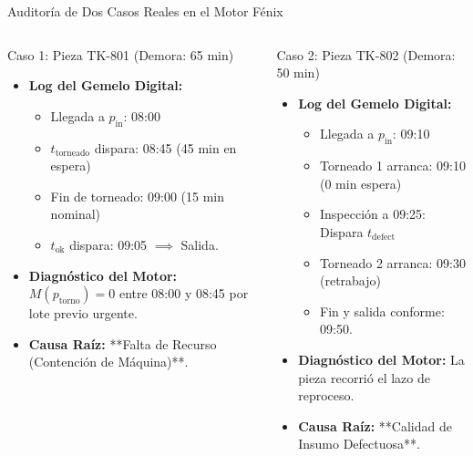 \documentclass[10pt, aspectratio=169]{beamer}
\begin{document}
\begin{frame}{Auditoría de Dos Casos Reales en el Motor Fénix}
	\begin{columns}
		\begin{alertblock}{Caso 1: Pieza TK-801 (Demora: 65 min)}
			\begin{itemize}
				\item \textbf{Log del Gemelo Digital:}
				\begin{itemize}
					\item Llegada a $p_{\text{in}}$: 08:00
					\item $t_{\text{torneado}}$ dispara: 08:45 (\alert{45 min en espera})
					\item Fin de torneado: 09:00 (15 min nominal)
					\item $t_{\text{ok}}$ dispara: 09:05 $\implies$ Salida.
				\end{itemize}
				\item \textbf{Diagnóstico del Motor:}
				$M(p_{\text{torno}}) = 0$ entre 08:00 y 08:45 por lote previo urgente.
				\item \textbf{Causa Raíz:} **Falta de Recurso (Contención de Máquina)**.
			\end{itemize}
		\end{alertblock}

		\begin{exampleblock}{Caso 2: Pieza TK-802 (Demora: 50 min)}
			\begin{itemize}
				\item \textbf{Log del Gemelo Digital:}
				\begin{itemize}
					\item Llegada a $p_{\text{in}}$: 09:10
					\item Torneado 1 arranca: 09:10 (0 min espera)
					\item Inspección a 09:25: \alert{Dispara $t_{\text{defect}}$}
					\item Torneado 2 arranca: 09:30 (retrabajo)
					\item Fin y salida conforme: 09:50.
				\end{itemize}
				\item \textbf{Diagnóstico del Motor:}
				La pieza recorrió el lazo de reproceso.
				\item \textbf{Causa Raíz:} **Calidad de Insumo Defectuosa**.
			\end{itemize}
		\end{exampleblock}
	\end{columns}
\end{frame}
\end{document}
